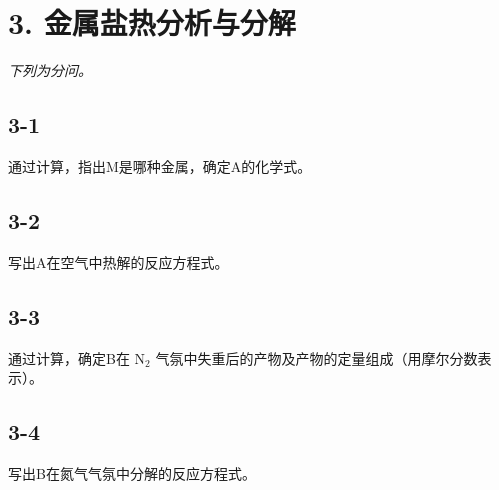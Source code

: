 \section*{3. 金属盐热分析与分解}
\textit{下列为分问。}

\subsection*{3-1}
通过计算，指出M是哪种⾦属，确定A的化学式。

\subsection*{3-2}
写出A在空⽓中热解的反应⽅程式。

\subsection*{3-3}
通过计算，确定B在 $\mathrm { N } _ { 2 }$ ⽓氛中失重后的产物及产物的定量组成（⽤摩尔分数表⽰）。

\subsection*{3-4}
写出B在氮⽓⽓氛中分解的反应⽅程式。
